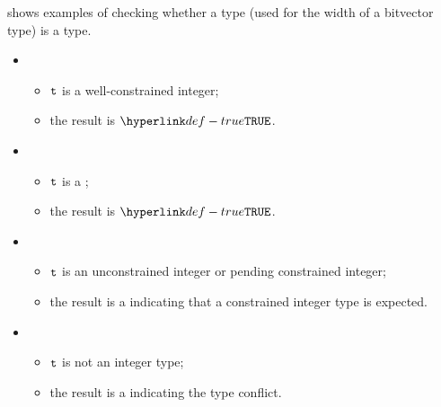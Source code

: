 shows examples of checking whether a type (used for the width of a bitvector type)
is a \constrainedinteger{} type.

\ProseParagraph
\OneApplies
\begin{itemize}
  \item {}
  \begin{itemize}
    \item $\texttt{t}$ is a well-constrained integer;
    \item the result is $\True$.
  \end{itemize}

  \item {}
  \begin{itemize}
    \item $\texttt{t}$ is a \parameterizedintegertype;
    \item the result is $\True$.
  \end{itemize}

  \item {}
  \begin{itemize}
    \item $\texttt{t}$ is an unconstrained integer or pending constrained integer;
    \item the result is a \typingerrorterm{} indicating that a constrained integer type is expected.
  \end{itemize}

  \item {}
  \begin{itemize}
    \item $\texttt{t}$ is not an integer type;
    \item the result is a \typingerrorterm{} indicating the type conflict.
  \end{itemize}
\end{itemize}

\FormallyParagraph
{}
